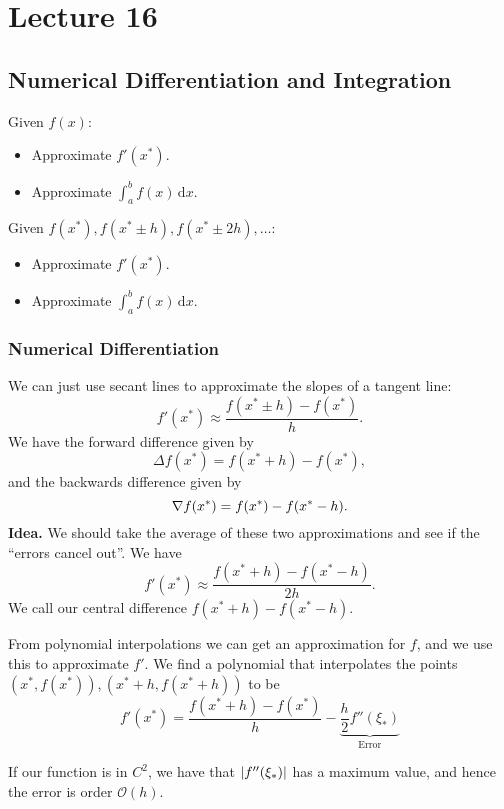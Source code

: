 \documentclass[class=article, crop=false]{standalone}
\begin{document}
  \section{Lecture 16}
  \subsection{Numerical Differentiation and Integration}
  Given $f(x)$:
  \begin{itemize}
    \item Approximate $f'(x^*)$.
    \item Approximate $\int_{a}^{b}f(x) \,\mathrm dx$.
  \end{itemize}
  Given $f(x^*), f(x^* \pm h), f(x^*\pm 2h),\dotsc$:
  \begin{itemize}
    \item Approximate $f'(x^*)$.
    \item Approximate $\int_{a}^{b}f(x) \,\mathrm dx$.
  \end{itemize}
  \subsubsection{Numerical Differentiation}
  We can just use secant lines to approximate the slopes of a tangent line:
  \[
    f'(x^*)\approx \frac{f(x^* \pm h) - f(x^*)}{h}.
  \]
  We have the forward difference given by
  \[
    \Delta f(x^*)= f(x^* + h) - f(x^*),
  \]
  and the backwards difference given by
  \[
    \nabla f(x^*)= f(x^*) - f(x^* - h).
  \]
  \textbf{Idea.} We should take the average of these two approximations and see if the ``errors cancel out''. We have
  \[
    f'(x^*)\approx \frac{f(x^* + h) - f(x^* - h)}{2h}.
  \]
  We call our central difference $f(x^* + h) - f(x^* - h)$. \par
  From polynomial interpolations we can get an approximation for $f$, and we use this to approximate $f'$. We find a polynomial that interpolates the points $(x^*, f(x^*)), (x^* + h, f(x^* + h))$ to be
  \[
    f'(x^*) = \frac{f(x^* + h) - f(x^*)}{h} - \underbrace{\frac{h}{2}f''(\xi_*)}_{\text{Error}}\tag{$\xi_*\in (x^*, x^* + h)$}
  \]
  \begin{note}{}
    If our function is in $C^2$, we have that $\left\lvert f''(\xi_*) \right\rvert$ has a maximum value, and hence the error is order $\mathcal{O}(h)$.
  \end{note}
\end{document}
